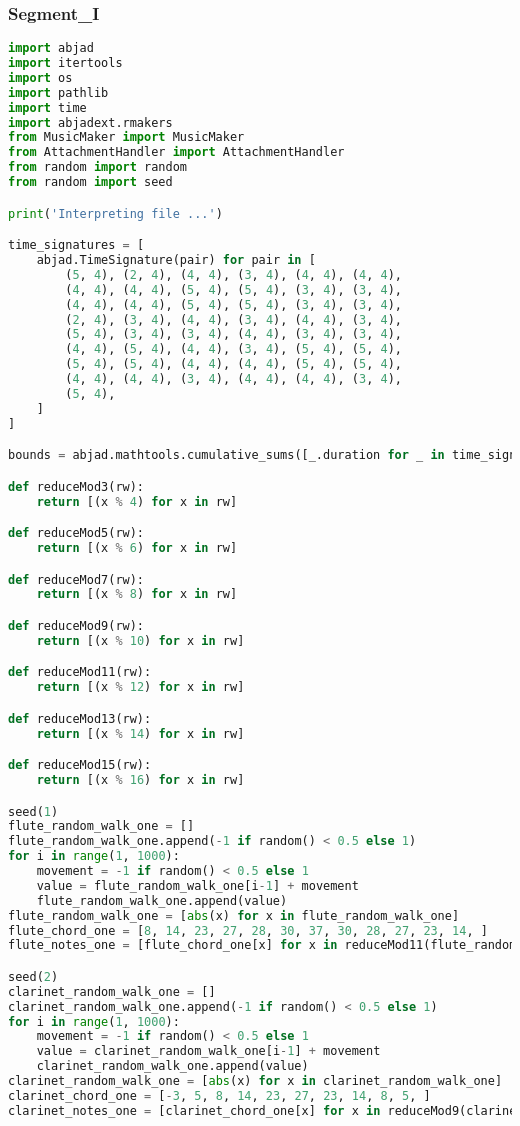\subsubsection{Segment\_I}
\singlespace
\begin{lstlisting}[language=Python, caption=Tianshu Segment\_I]
import abjad
import itertools
import os
import pathlib
import time
import abjadext.rmakers
from MusicMaker import MusicMaker
from AttachmentHandler import AttachmentHandler
from random import random
from random import seed

print('Interpreting file ...')

time_signatures = [
    abjad.TimeSignature(pair) for pair in [
        (5, 4), (2, 4), (4, 4), (3, 4), (4, 4), (4, 4),
        (4, 4), (4, 4), (5, 4), (5, 4), (3, 4), (3, 4),
        (4, 4), (4, 4), (5, 4), (5, 4), (3, 4), (3, 4),
        (2, 4), (3, 4), (4, 4), (3, 4), (4, 4), (3, 4),
        (5, 4), (3, 4), (3, 4), (4, 4), (3, 4), (3, 4),
        (4, 4), (5, 4), (4, 4), (3, 4), (5, 4), (5, 4),
        (5, 4), (5, 4), (4, 4), (4, 4), (5, 4), (5, 4),
        (4, 4), (4, 4), (3, 4), (4, 4), (4, 4), (3, 4),
        (5, 4),
    ]
]

bounds = abjad.mathtools.cumulative_sums([_.duration for _ in time_signatures])

def reduceMod3(rw):
    return [(x % 4) for x in rw]

def reduceMod5(rw):
    return [(x % 6) for x in rw]

def reduceMod7(rw):
    return [(x % 8) for x in rw]

def reduceMod9(rw):
    return [(x % 10) for x in rw]

def reduceMod11(rw):
    return [(x % 12) for x in rw]

def reduceMod13(rw):
    return [(x % 14) for x in rw]

def reduceMod15(rw):
    return [(x % 16) for x in rw]

seed(1)
flute_random_walk_one = []
flute_random_walk_one.append(-1 if random() < 0.5 else 1)
for i in range(1, 1000):
    movement = -1 if random() < 0.5 else 1
    value = flute_random_walk_one[i-1] + movement
    flute_random_walk_one.append(value)
flute_random_walk_one = [abs(x) for x in flute_random_walk_one]
flute_chord_one = [8, 14, 23, 27, 28, 30, 37, 30, 28, 27, 23, 14, ]
flute_notes_one = [flute_chord_one[x] for x in reduceMod11(flute_random_walk_one)]

seed(2)
clarinet_random_walk_one = []
clarinet_random_walk_one.append(-1 if random() < 0.5 else 1)
for i in range(1, 1000):
    movement = -1 if random() < 0.5 else 1
    value = clarinet_random_walk_one[i-1] + movement
    clarinet_random_walk_one.append(value)
clarinet_random_walk_one = [abs(x) for x in clarinet_random_walk_one]
clarinet_chord_one = [-3, 5, 8, 14, 23, 27, 23, 14, 8, 5, ]
clarinet_notes_one = [clarinet_chord_one[x] for x in reduceMod9(clarinet_random_walk_one)]


\end{lstlisting}
